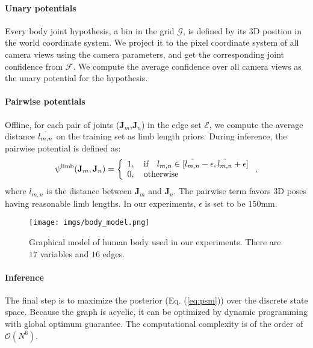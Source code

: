\documentclass[10pt,twocolumn,letterpaper]{article}
\begin{document}
\paragraph{Unary potentials} Every body joint hypothesis, \ie a bin in the grid $\mathcal{G}$, is defined by its $3$D position in the world coordinate system. We project it to the pixel coordinate system of all camera views using the camera parameters, and get the corresponding joint confidence from $\mathcal{F}$. We compute the average confidence over all camera views as the unary potential for the hypothesis.

\paragraph{Pairwise potentials}
Offline, for each pair of joints ($\bm{J}_m$,$\bm{J}_n$) in the edge set $\mathcal{E}$, we compute the average distance $\Tilde{l_{m,n}}$ on the training set as limb length priors. During inference, the pairwise potential is defined as:
\begin{equation}
    \psi^{\text{limb}}(\mathbf{J}_m, \mathbf{J}_n) = 
    \left\{
                \begin{array}{ll}
                  1, \quad \text{if} \quad l_{m,n} \in [\Tilde{l_{m,n}}-\epsilon, \Tilde{l_{m,n}}+\epsilon] \\
                  0, \quad \text{otherwise}
                \end{array}
              \right.,
\end{equation}
where $l_{m,n}$ is the distance between $\bm{J}_m$ and $\bm{J}_n$.
The pairwise term favors $3$D poses having reasonable limb lengths. In our experiments, $\epsilon$ is set to be $150$mm.

\begin{figure}
	\centering
	\texttt{[image: imgs/body\_model.png]}
	\caption{Graphical model of human body used in our experiments. There are $17$ variables and $16$ edges. }
	\label{fig:body_model}
\end{figure}



\paragraph{Inference}
The final step is to maximize the posterior (Eq. (\ref{eq:psm})) over the discrete state space. Because the graph is acyclic, it can be optimized by dynamic programming with global optimum guarantee. The computational complexity is of the order of $\mathcal{O}{(N^6)}$.
\end{document}
